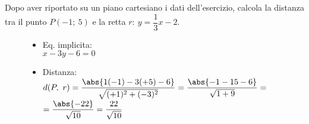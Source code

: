  \begin{esempio}
  Dopo aver riportato su un piano cartesiano i dati dell'esercizio,
  calcola la distanza tra il punto \(P(-1;~5)\) e
  la retta \(r:~y = \dfrac{1}{3} x -2\). 

\begin{inaccessibleblock}
 \begin{figure}[h]
 \centering
\hspace{-5mm}
\begin{minipage}[]{.62\textwidth}
\begin{itemize}
  \item Eq. implicita:\\
  \(x -3y -6 = 0\)\\
  \item Distanza: \\
  \(d(P,~r) = \dfrac{\abs{1(-1) -3(+5) -6}}{\sqrt{(+1)^2 + (-3)^2}}=
  \dfrac{\abs{-1 -15 -6}}{\sqrt{1 + 9}}=\)\\[.5em]
  \(= \dfrac{\abs{-22}}{\sqrt{10}}=\dfrac{22}{\sqrt{10}}\)
  \end{itemize}
 \end{minipage}
 \begin{minipage}[]{.40\textwidth}
   \begin{center} \distpuntorettaa \end{center}
 \end{minipage}
\label{fig:metodorapido}
\end{figure}
\end{inaccessibleblock}
 \end{esempio}
 
